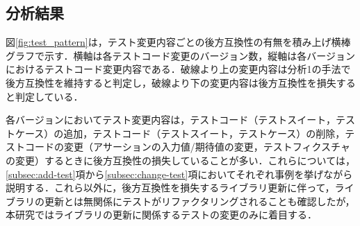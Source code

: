 \documentclass[submit]{ipsj}
\begin{document}
\subsection{分析結果}

図\ref{fig:test_pattern}は，テスト変更内容ごとの後方互換性の有無を積み上げ横棒グラフで示す．横軸は各テストコード変更のバージョン数，縦軸は各バージョンにおけるテストコード変更内容である．破線より上の変更内容は分析1の手法で後方互換性を維持すると判定し，破線より下の変更内容は後方互換性を損失すると判定している．

各バージョンにおいてテスト変更内容は，テストコード（テストスイート，テストケース\textcolor{red}{}）の追加，テストコード（テストスイート，テストケース）の削除，テストコードの変更（アサーションの入力値/期待値の変更，テストフィクスチャの変更）するときに後方互換性の損失していることが多い．これらについては，\ref{subsec:add-test}項から\ref{subsec:change-test}項においてそれぞれ事例を挙げながら説明する．\textcolor{red}{}これら以外に，後方互換性を損失するライブラリ更新に伴って，ライブラリの更新とは無関係にテストがリファクタリングされることも確認したが，本研究ではライブラリの更新に関係するテストの変更のみに着目する．

\end{document}
